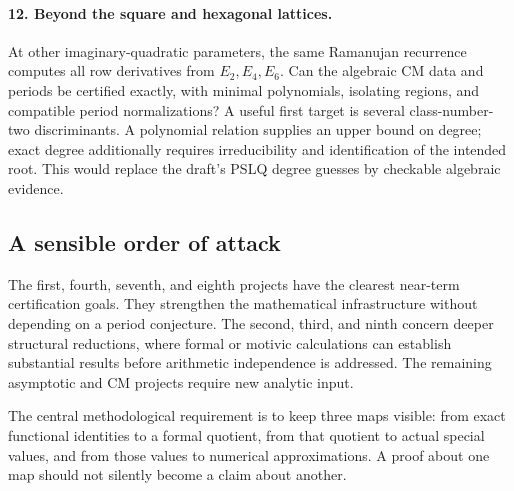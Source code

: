 \paragraph{12. Beyond the square and hexagonal lattices.}
At other imaginary-quadratic parameters, the same Ramanujan
recurrence computes all row derivatives from \(E_2,E_4,E_6\).
Can the algebraic CM data and periods be certified exactly, with
minimal polynomials, isolating regions, and compatible period
normalizations? A useful first target is several class-number-two
discriminants. A polynomial relation supplies an upper bound on
degree; exact degree additionally requires irreducibility and
identification of the intended root. This would replace the draft's
PSLQ degree guesses by checkable algebraic evidence.

\subsection{A sensible order of attack}

The first, fourth, seventh, and eighth projects have the clearest
near-term certification goals. They strengthen the mathematical
infrastructure without depending on a period conjecture. The second,
third, and ninth concern deeper structural reductions, where formal
or motivic calculations can establish substantial results before
arithmetic independence is addressed. The remaining asymptotic and CM
projects require new analytic input.

The central methodological requirement is to keep three maps visible:
from exact functional identities to a formal quotient, from that
quotient to actual special values, and from those values to numerical
approximations. A proof about one map should not silently become a
claim about another.
